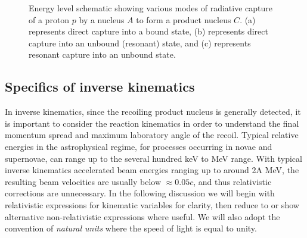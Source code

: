\begin{figure}
\caption{Energy level schematic showing various modes of radiative capture of a proton $p$ by a nucleus $A$ to form a product nucleus $C$. (a) represents direct capture into a bound state, (b) represents direct capture into an unbound (resonant) state, and (c) represents resonant capture into an unbound state.}
\label{fig:radcap}       %
\end{figure}


\subsection{Specifics of inverse kinematics}
\label{specifics}

In inverse kinematics, since the recoiling product nucleus is generally detected, it is important to consider the reaction kinematics in order to understand the final momentum spread and maximum laboratory angle of the recoil. Typical relative energies in the astrophysical regime, for processes occurring in novae and supernovae, can range up to the several hundred keV to MeV range. With typical inverse kinematics accelerated beam energies ranging up to around 2A MeV, the resulting beam velocities are usually below  $\approx0.05c$, and thus relativistic corrections are unnecessary. In the following discussion we will begin with relativistic expressions for kinematic variables for clarity, then reduce to or show alternative non-relativistic expressions where useful. We will also adopt the convention of {\em natural units} where the speed of light is equal to unity.

